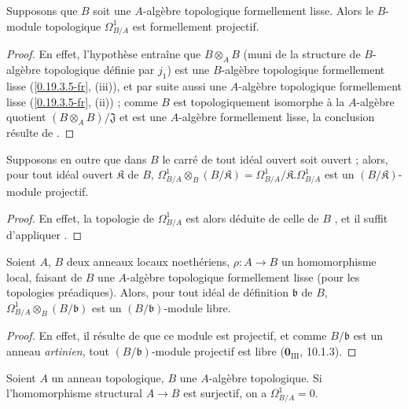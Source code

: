 \begin{theorem}[20.4.9]
\label{0.20.4.9-fr}
Supposons que $B$ soit une $A$-algèbre topologique formellement lisse. Alors
le $B$-module topologique $\Omega^1_{B/A}$ est formellement projectif.
\end{theorem}

\begin{proof}
En effet, l'hypothèse entraîne que $B\otimes_A B$ (muni de la structure de
$B$-algèbre topologique définie par $j_1$) est une $B$-algèbre topologique
formellement lisse (\ref{0.19.3.5-fr}, (iii)), et par suite aussi une
$A$-algèbre topologique formellement lisse (\ref{0.19.3.5-fr}, (ii)) ; comme
$B$ est topologiquement isomorphe à la $A$-algèbre quotient
$(B\otimes_A B)/\mathfrak{J}$ et est une $A$-algèbre formellement lisse, la
conclusion résulte de .
\end{proof}

\begin{corollary}[20.4.10]
\label{0.20.4.10-fr}
Supposons en outre que dans $B$ le carré de tout idéal ouvert soit ouvert ;
alors, pour tout idéal ouvert $\mathfrak{K}$ de $B$,
$\Omega^1_{B/A}\otimes_B(B/\mathfrak{K})
=\Omega^1_{B/A}/\mathfrak{K}.\Omega^1_{B/A}$ est un
$(B/\mathfrak{K})$-module projectif.
\end{corollary}

\begin{proof}
En effet, la topologie de $\Omega^1_{B/A}$ est alors déduite de celle de
$B$ , et il suffit d'appliquer .
\end{proof}

\begin{corollary}[20.4.11]
\label{0.20.4.11-fr}
Soient $A$, $B$ deux anneaux locaux noethériens, $\rho:A\to B$ un
homomorphisme local, faisant de $B$ une $A$-algèbre topologique formellement
lisse (pour les topologies préadiques). Alors, pour tout idéal de définition
$\mathfrak{b}$ de $B$,
$\Omega^1_{B/A}\otimes_B(B/\mathfrak{b})$ est un
$(B/\mathfrak{b})$-module libre.
\end{corollary}

\begin{proof}
En effet, il résulte de  que ce module est projectif, et
comme $B/\mathfrak{b}$ est un anneau \emph{artinien}, tout
$(B/\mathfrak{b})$-module projectif est libre
($\mathbf{0}_{\mathrm{III}}$, 10.1.3).
\end{proof}

\begin{proposition}[20.4.12]
\label{0.20.4.12-fr}
Soient $A$ un anneau topologique, $B$ une $A$-algèbre topologique. Si
l'homomorphisme structural $A\to B$ est surjectif, on a
$\Omega^1_{B/A}=0$.
\end{proposition}

